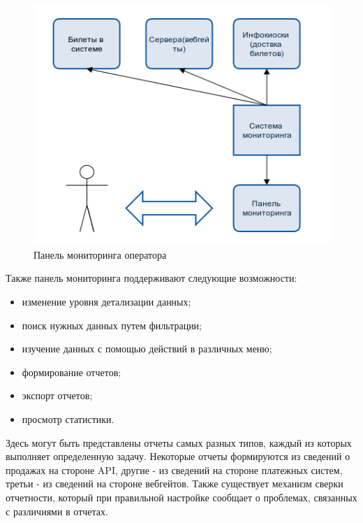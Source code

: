 \begin{figure}[H]
  	\centering
 	\includegraphics[width=1\textwidth]{images/panel.png}
  	\caption{Панель мониторинга оператора}
    \label{fig:panel.png}
\end{figure}

Также панель мониторинга поддерживают следующие возможности:

\begin{itemize}
	\item изменение уровня детализации данных;
    \item поиск нужных данных путем фильтрации;
    \item изучение данных с помощью действий в различных меню;
    \item формирование отчетов;
    \item экспорт отчетов;
	\item просмотр статистики.
\end{itemize}

Здесь могут быть представлены отчеты самых разных типов, каждый из которых выполняет определенную задачу. Некоторые отчеты формируются из сведений о продажах на стороне API, другие - из сведений на стороне платежных систем, третьи - из сведений на стороне вебгейтов. Также существует механизм сверки отчетности, который при правильной настройке сообщает о проблемах, связанных с различиями в отчетах.


















\newpage